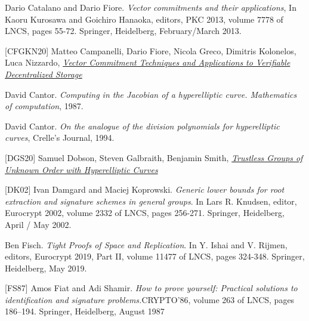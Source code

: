 \documentclass[11pt, lettersize, notitlepage, leqno, footskip=0.6cm]{article}
\newcommand{\noin}{\noindent}
\numberwithin{equation}{section}
\begin{document}
\noin [CF13] Dario Catalano and Dario Fiore. \textit{Vector commitments and their applications}, In Kaoru Kurosawa and Goichiro Hanaoka, editors, PKC 2013, volume 7778 of LNCS, pages 55-72. Springer, Heidelberg, February/March 2013. \vspace{0.1cm}

\noindent \hypertarget{CFGKN20}{[CFGKN20]} Matteo Campanelli, Dario Fiore, Nicola Greco, Dimitris Kolonelos, Luca Nizzardo, \href{https://eprint.iacr.org/2020/149}{\textit{Vector Commitment Techniques and Applications to Verifiable Decentralized Storage}} \vspace{0.1cm}


\noindent [Can87] David Cantor. \textit{Computing in the Jacobian of a hyperelliptic curve. Mathematics of computation}, 1987.\vspace{0.1cm}

\noindent [Can94] David Cantor. \textit{On the analogue of the division polynomials for hyperelliptic curves}, Crelle's Journal, 1994.\vspace{0.1cm}


\noindent \hypertarget{DGS20}{[DGS20]} Samuel Dobson, Steven Galbraith, Benjamin Smith, \href{https://eprint.iacr.org/2020/196}{\textit{Trustless Groups of Unknown Order with Hyperelliptic Curves}} \vspace{0.1cm}

\noin \hypertarget{{DK02}}{[DK02]} Ivan Damgard and Maciej Koprowski. \textit{Generic lower bounds for root extraction and signature schemes in general groups}. In Lars R. Knudsen, editor, Eurocrypt 2002, volume 2332 of LNCS, pages 256-271. Springer, Heidelberg, April / May 2002.\vspace{0.1cm}

\noin [Fis18] Ben Fisch. \textit{Tight Proofs of Space and Replication}. In Y. Ishai and V. Rijmen, editors, Eurocrypt 2019, Part II, volume 11477 of LNCS, pages 324-348. Springer, Heidelberg, May 2019. \vspace{0.1cm}

\noindent \hypertarget{FS87}{[FS87]} Amos Fiat and Adi Shamir. \textit{How to prove yourself: Practical solutions to identification and signature problems.}CRYPTO’86, volume 263 of LNCS, pages 186–194. Springer, Heidelberg, August 1987\vspace{0.1cm}
\end{document}
